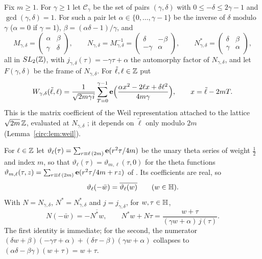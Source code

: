 Fix $m\ge1$. For $\gamma\ge1$ let $\mathcal C_\gamma$ be the set of pairs $(\gamma,\delta)$ with $0\le-\delta\le2\gamma-1$ and $\gcd(\gamma,\delta)=1$. For such a pair let $\alpha\in\{0,\dots,\gamma-1\}$ be the inverse of $\delta$ modulo $\gamma$ ($\alpha=0$ if $\gamma=1$), $\beta=(\alpha\delta-1)/\gamma$, and
\[
M_{\gamma,\delta}=\begin{pmatrix}\alpha&\beta\\\gamma&\delta\end{pmatrix},\qquad N_{\gamma,\delta}=M_{\gamma,\delta}^{-1}=\begin{pmatrix}\delta&-\beta\\-\gamma&\alpha\end{pmatrix},\qquad N^*_{\gamma,\delta}=\begin{pmatrix}\delta&\beta\\\gamma&\alpha\end{pmatrix},
\]
all in $SL_2(\mathbb{Z})$, with $j_{\gamma,\delta}(\tau)=-\gamma\tau+\alpha$ the automorphy factor of $N_{\gamma,\delta}$, and let $F(\gamma,\delta)$ be the frame of $N_{\gamma,\delta}$. For $\tilde\ell,\ell\in\mathbb{Z}$ put
\begin{equation}\label{eq:weil}
W_{\gamma,\delta}(\tilde\ell,\ell)=\frac1{\sqrt{2m\gamma i}}\sum_{T=0}^{\gamma-1}\mathbf e\Big(\frac{\alpha x^2-2\ell x+\delta\ell^2}{4m\gamma}\Big),\qquad x=\tilde\ell-2mT .
\end{equation}
This is the matrix coefficient of the Weil representation attached to the lattice $\sqrt{2m}\,\mathbb{Z}$, evaluated at $N_{\gamma,\delta}$ \cite[(2.41)]{CNR21}; it depends on $\tilde\ell$ only modulo $2m$ (Lemma~\ref{circ:lem:weil}).

For $\ell\in\mathbb{Z}$ let $\vartheta_\ell(\tau)=\sum_{r\equiv\ell\,(2m)}\mathbf e(r^2\tau/4m)$ be the unary theta series of weight $\frac12$ and index $m$, so that $\vartheta_\ell(\tau)=\vartheta_{m,\ell}(\tau,0)$ for the theta functions $\vartheta_{m,\ell}(\tau,z)=\sum_{r\equiv\ell\,(2m)}\mathbf e(r^2\tau/4m+rz)$ of \cite[\S5]{EZ85}. Its coefficients are real, so
\begin{equation}\label{circ:thetaconj}
\vartheta_\ell(-\bar w)=\overline{\vartheta_\ell(w)}\qquad(w\in\mathbb{H}).
\end{equation}
With $N=N_{\gamma,\delta}$, $N^*=N^*_{\gamma,\delta}$ and $j=j_{\gamma,\delta}$, for $w,\tau\in\mathbb{H}$,
\begin{equation}\label{circ:Nstar}
N(-\bar w)=-\overline{N^*w},\qquad N^*w+N\tau=\frac{w+\tau}{(\gamma w+\alpha)\,j(\tau)} .
\end{equation}
The first identity is immediate; for the second, the numerator $(\delta w+\beta)(-\gamma\tau+\alpha)+(\delta\tau-\beta)(\gamma w+\alpha)$ collapses to $(\alpha\delta-\beta\gamma)(w+\tau)=w+\tau$.

